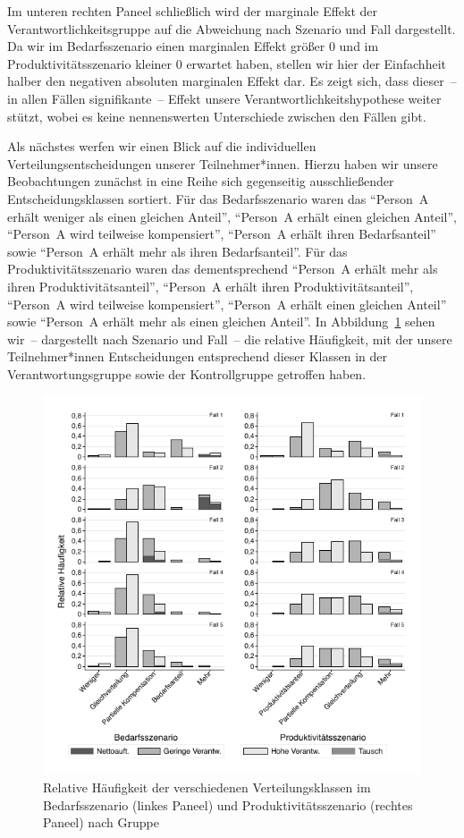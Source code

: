 \documentclass[justified,nobib,symmetric,twoside]{tufte-handout}
\begin{document}
Im unteren rechten Paneel schließlich wird der marginale Effekt der Verantwortlichkeitsgruppe auf die Abweichung nach Szenario und Fall dargestellt.
Da wir im Bedarfsszenario einen marginalen Effekt größer 0 und im Produktivitätsszenario kleiner 0 erwartet haben, stellen wir hier der Einfachheit halber den negativen absoluten marginalen Effekt dar.
Es zeigt sich, dass dieser~-- in allen Fällen signifikante~-- Effekt unsere Verantwortlichkeitshypothese weiter stützt, wobei es keine nennenswerten Unterschiede zwischen den Fällen gibt.

Als nächstes werfen wir einen Blick auf die individuellen Verteilungsentscheidungen unserer Teilnehmer*innen.
Hierzu haben wir unsere Beobachtungen zunächst in eine Reihe sich gegenseitig ausschließender Entscheidungsklassen sortiert.
Für das Bedarfsszenario waren das \enquote{Person~A erhält weniger als einen gleichen Anteil}, \enquote{Person~A erhält einen gleichen Anteil}, \enquote{Person~A wird teilweise kompensiert}, \enquote{Person~A erhält ihren Bedarfsanteil} sowie \enquote{Person~A erhält mehr als ihren Bedarfsanteil}.
Für das Produktivitätsszenario waren das dementsprechend \enquote{Person~A erhält mehr als ihren Produktivitätsanteil}, \enquote{Person~A erhält ihren Produktivitätsanteil}, \enquote{Person~A wird teilweise kompensiert}, \enquote{Person~A erhält einen gleichen Anteil} sowie \enquote{Person~A erhält mehr als einen gleichen Anteil}.
In Abbildung~\ref{fig:abbildung_9} sehen wir~-- dargestellt nach Szenario und Fall~-- die relative Häufigkeit, mit der unsere Teilnehmer*innen Entscheidungen entsprechend dieser Klassen in der Verantwortungsgruppe sowie der Kontrollgruppe getroffen haben.

\begin{figure}[t]\label{fig:abbildung_9}
   \center
   \caption{Relative Häufigkeit der verschiedenen Verteilungsklassen
im Bedarfsszenario (linkes Paneel) und Produktivitätsszenario (rechtes Paneel) nach Gruppe}
   \includegraphics[width=0.99\linewidth]{figure_9.pdf}
\end{figure}
\end{document}
